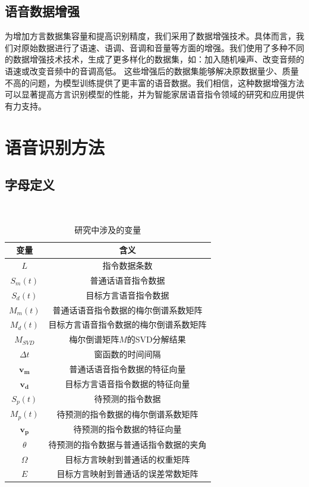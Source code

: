 \documentclass[lang=cn,cite=super]{elegantpaper}
\begin{document}
\subsection{语音数据增强}
为增加方言数据集容量和提高识别精度，我们采用了数据增强技术。具体而言，我们对原始数据进行了语速、语调、音调和音量等方面的增强。我们使用了多种不同的数据增强技术技术，生成了更多样化的数据集，如：加入随机噪声、改变音频的语速或改变音频中的音调高低。
这些增强后的数据集能够解决原数据量少、质量不高的问题，为模型训练提供了更丰富的语音数据。我们相信，这种数据增强方法可以显著提高方言识别模型的性能，并为智能家居语音指令领域的研究和应用提供有力支持。
\section{语音识别方法}
\subsection{字母定义}
\begin{table}[h]
    \caption{\label{tab:2} 研究中涉及的变量}\
    \begin{center}
        \begin{tabular}{cc}
            \hline
            \textbf{变量} & \textbf{含义}\\
            \hline \hline
            $L$ & 指令数据条数\\
            $S_m(t)$ & 普通话语音指令数据\\
            $S_d(t)$ & 目标方言语音指令数据\\
            $M_m(t)$ & 普通话语音指令数据的梅尔倒谱系数矩阵\\
            $M_d(t)$ & 目标方言语音指令数据的梅尔倒谱系数矩阵\\
            $M_{SVD}$ & 梅尔倒谱矩阵$M$的SVD分解结果\\
            $\Delta t$ & 窗函数的时间间隔\\
            $\bm{v_m}$ & 普通话语音指令数据的特征向量\\
            $\bm{v_d}$ & 目标方言语音指令数据的特征向量\\
            $S_p(t)$ & 待预测的指令数据\\
            $M_p(t)$ & 待预测的指令数据的梅尔倒谱系数矩阵\\
            $\bm{v_p}$ & 待预测的指令数据的特征向量\\
            $\theta$ & 待预测的指令数据与普通话指令数据的夹角\\
            $\Omega$ & 目标方言映射到普通话的权重矩阵\\
            $E$ & 目标方言映射到普通话的误差常数矩阵\\
            \hline
        \end{tabular}
    \end{center}
\end{table}
\end{document}
